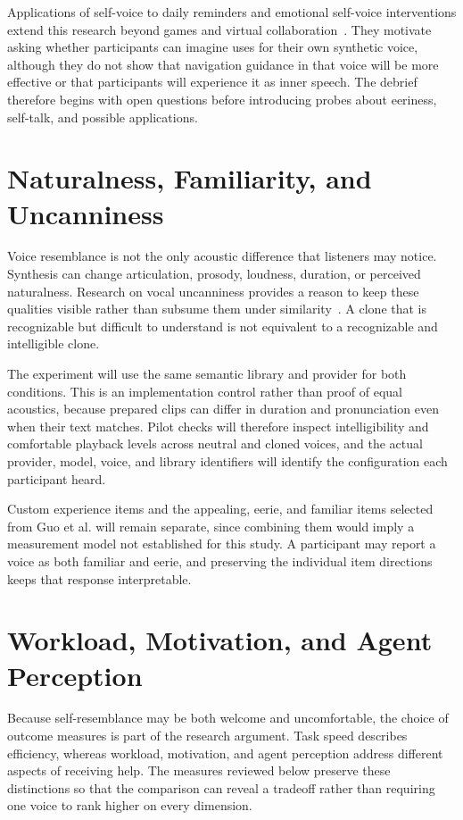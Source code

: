 Applications of self-voice to daily reminders and emotional self-voice interventions extend this research beyond games and virtual collaboration~\cite{kim2024selfvoice,fang2025emotional}. They motivate asking whether participants can imagine uses for their own synthetic voice, although they do not show that navigation guidance in that voice will be more effective or that participants will experience it as inner speech. The debrief therefore begins with open questions before introducing probes about eeriness, self-talk, and possible applications.

\section{Naturalness, Familiarity, and Uncanniness}
Voice resemblance is not the only acoustic difference that listeners may notice. Synthesis can change articulation, prosody, loudness, duration, or perceived naturalness. Research on vocal uncanniness provides a reason to keep these qualities visible rather than subsume them under similarity~\cite{diel2024uncanny}. A clone that is recognizable but difficult to understand is not equivalent to a recognizable and intelligible clone.

The experiment will use the same semantic library and provider for both conditions. This is an implementation control rather than proof of equal acoustics, because prepared clips can differ in duration and pronunciation even when their text matches. Pilot checks will therefore inspect intelligibility and comfortable playback levels across neutral and cloned voices, and the actual provider, model, voice, and library identifiers will identify the configuration each participant heard.

Custom experience items and the appealing, eerie, and familiar items selected from Guo et al. will remain separate, since combining them would imply a measurement model not established for this study. A participant may report a voice as both familiar and eerie, and preserving the individual item directions keeps that response interpretable.

\section{Workload, Motivation, and Agent Perception}
Because self-resemblance may be both welcome and uncomfortable, the choice of outcome measures is part of the research argument. Task speed describes efficiency, whereas workload, motivation, and agent perception address different aspects of receiving help. The measures reviewed below preserve these distinctions so that the comparison can reveal a tradeoff rather than requiring one voice to rank higher on every dimension.

